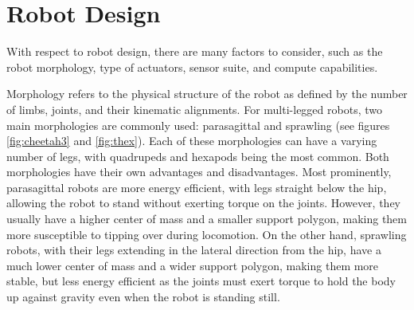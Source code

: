 
\section{Robot Design}

With respect to robot design, there are many factors to consider, such as the robot morphology, type of actuators, sensor suite, and compute capabilities.

Morphology refers to the physical structure of the robot as defined by the number of limbs, joints, and their kinematic alignments. For multi-legged robots, two main morphologies are commonly used: parasagittal and sprawling (see figures \ref{fig:cheetah3} and \ref{fig:thex}). Each of these morphologies can have a varying number of legs, with quadrupeds and hexapods being the most common. Both morphologies have their own advantages and disadvantages. Most prominently, parasagittal robots are more energy efficient, with legs straight below the hip, allowing the robot to stand without exerting torque on the joints. However, they usually have a higher center of mass and a smaller support polygon, making them more susceptible to tipping over during locomotion. On the other hand, sprawling robots, with their legs extending in the lateral direction from the hip, have a much lower center of mass and a wider support polygon, making them more stable, but less energy efficient as the joints must exert torque to hold the body up against gravity even when the robot is standing still.


